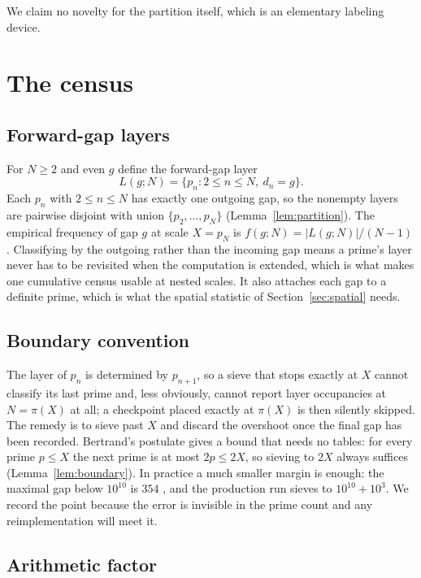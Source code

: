 \documentclass[11pt,a4paper]{article}
\begin{document}
We claim no novelty for the partition itself, which is an elementary labeling device.

\section{The census}
\label{sec:census}

\subsection{Forward-gap layers}

For $N\ge2$ and even $g$ define the forward-gap layer
\begin{equation}
L(g;N)=\{p_n : 2\le n\le N,\ d_n=g\}.
\end{equation}
Each $p_n$ with $2\le n\le N$ has exactly one outgoing gap, so the nonempty layers are pairwise disjoint with union $\{p_2,\dots,p_N\}$ (Lemma~\ref{lem:partition}). The empirical frequency of gap $g$ at scale $X=p_N$ is $f(g;N)=|L(g;N)|/(N-1)$. Classifying by the outgoing rather than the incoming gap means a prime's layer never has to be revisited when the computation is extended, which is what makes one cumulative census usable at \nScales{} nested scales. It also attaches each gap to a definite prime, which is what the spatial statistic of Section~\ref{sec:spatial} needs.

\subsection{Boundary convention}

The layer of $p_n$ is determined by $p_{n+1}$, so a sieve that stops exactly at $X$ cannot classify its last prime and, less obviously, cannot report layer occupancies at $N=\pi(X)$ at all; a checkpoint placed exactly at $\pi(X)$ is then silently skipped. The remedy is to sieve past $X$ and discard the overshoot once the final gap has been recorded. Bertrand's postulate gives a bound that needs no tables: for every prime $p\le X$ the next prime is at most $2p\le 2X$, so sieving to $2X$ always suffices (Lemma~\ref{lem:boundary}). In practice a much smaller margin is enough: the maximal gap below $10^{10}$ is $354$ \cite{Nicely1999,OliveiraeSilvaHerzogPardi2014}, and the production run sieves to $10^{10}+10^{3}$. We record the point because the error is invisible in the prime count and any reimplementation will meet it.

\subsection{Arithmetic factor}
\end{document}
